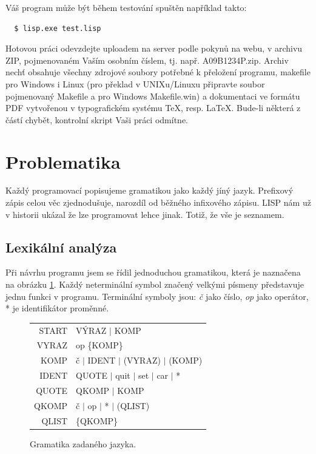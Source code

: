 \documentclass[a4paper, 12pt]{article}
\begin{document}
Váš program může být během testování spuštěn například takto:
\begin{verbatim}
  $ lisp.exe test.lisp
\end{verbatim}

Hotovou práci odevzdejte uploadem na server podle pokynů na webu, v
archivu ZIP, pojmenovaném Vaším osobním číslem, tj. např.
\textsf{A09B1234P.zip}. Archiv nechť obsahuje všechny zdrojové soubory
potřebné k přeložení programu, \textsf{makefile} pro Windows i Linux
(pro překlad v UNIXu/Linuxu připravte soubor pojmenovaný
\textsf{Makefile} a pro Windows \textsf{Makefile.win}) a dokumentaci
ve formátu PDF vytvořenou v typografickém systému \TeX{}, resp.
\LaTeX{}. Bude-li některá z částí chybět, kontrolní skript Vaši práci
odmítne.

\section{Problematika}
Každý programovací popisujeme gramatikou jako každý jíný jazyk.
Prefixový zápis celou věc zjednodušuje, narozdíl od běžného infixového
zápisu. LISP nám už v historii ukázal že lze programovat lehce jinak.
Totiž, že vše je seznamem.

\subsection{Lexikální analýza}
Při návrhu programu jsem se řídil jednoduchou gramatikou, která je
naznačena na obrázku \ref{fig:gram}. Každý neterminální symbol značený
velkými písmeny představuje jednu funkci v programu. Terminální symboly
jsou: \emph{č} jako číslo, \emph{op} jako operátor, * je identifikátor
proměnné.

\begin{figure}
\centering
\begin{tabular}{r@{$\quad\longrightarrow\quad$}l}
START & VÝRAZ $|$ KOMP\\
VYRAZ & op \{KOMP\}\\
KOMP & č $|$ IDENT $|$ (VYRAZ) $|$ (KOMP)\\
IDENT & QUOTE $|$ quit $|$ set $|$ car $|$ *\\[1ex]
QUOTE & QKOMP $|$ KOMP\\
QKOMP & č $|$ op $|$ * $|$ (QLIST)\\
QLIST & \{QKOMP\}

\end{tabular}

\caption{Gramatika zadaného jazyka.}
\label{fig:gram}
\end{figure}
\end{document}
